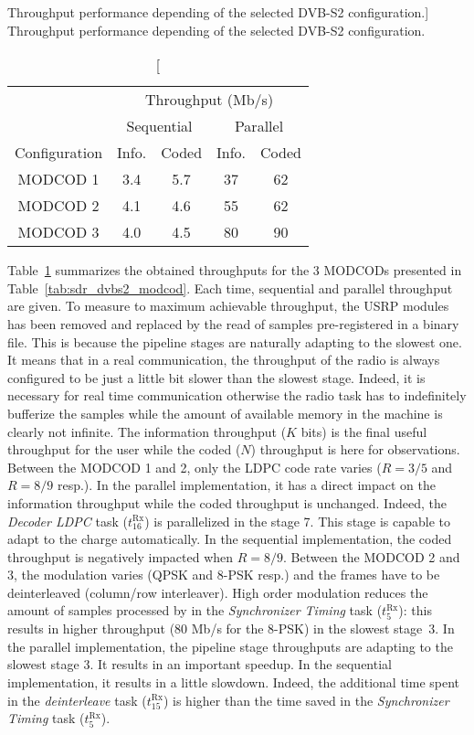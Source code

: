\begin{table}[htp]
  \centering
  \caption
    [Throughput performance depending of the selected DVB-S2 configuration.]
    {Throughput performance depending of the selected DVB-S2 configuration.}
  \label{tab:sdr_dvbs2_thr_modcod}
  \begin{tabular}{c c c c c}
  \toprule
  & \multicolumn{4}{c}{Throughput (Mb/s)} \\
  \cmidrule(lr){2-5}
  & \multicolumn{2}{c}{Sequential} & \multicolumn{2}{c}{Parallel} \\
  \cmidrule(lr){2-3} \cmidrule(lr){4-5}
  Configuration & Info. & Coded & Info. & Coded \\
  \midrule
  MODCOD 1 & 3.4 & 5.7 & 37 & 62 \\
  MODCOD 2 & 4.1 & 4.6 & 55 & 62 \\
  MODCOD 3 & 4.0 & 4.5 & 80 & 90 \\
  \bottomrule
  \end{tabular}
\end{table}

Table~\ref{tab:sdr_dvbs2_thr_modcod} summarizes the obtained throughputs for the
3 MODCODs presented in Table~\ref{tab:sdr_dvbs2_modcod}. Each time, sequential
and parallel throughput are given. To measure to maximum achievable throughput,
the USRP modules has been removed and replaced by the read of samples
pre-registered in a binary file. This is because the pipeline stages are
naturally adapting to the slowest one. It means that in a real communication,
the throughput of the radio is always configured to be just a little bit slower
than the slowest stage. Indeed, it is necessary for real time communication
otherwise the radio task has to indefinitely bufferize the samples while the
amount of available memory in the machine is clearly not infinite. The
information throughput ($K$ bits) is the final useful throughput for the user
while the coded ($N$) throughput is here for observations. Between the MODCOD 1
and 2, only the LDPC code rate varies ($R=3/5$ and $R=8/9$ resp.). In the
parallel implementation, it has a direct impact on the information throughput
while the coded throughput is unchanged. Indeed, the \emph{Decoder LDPC} task
($t^\text{Rx}_{16}$) is parallelized in the stage 7. This stage is capable to
adapt to the charge automatically. In the sequential implementation, the coded
throughput is negatively impacted when $R=8/9$. Between the MODCOD 2 and 3, the
modulation varies (QPSK and 8-PSK resp.) and the frames have to be deinterleaved
(column/row interleaver). High order modulation reduces the amount of samples
processed by in the \emph{Synchronizer Timing} task ($t^\text{Rx}_{5}$): this
results in higher throughput (80 Mb/s for the 8-PSK) in the slowest stage~3. In
the parallel implementation, the pipeline stage throughputs are adapting to the
slowest stage 3. It results in an important speedup. In the sequential
implementation, it results in a little slowdown. Indeed, the additional time
spent in the  \emph{deinterleave} task ($t^\text{Rx}_{15}$) is higher than
the time saved in the \emph{Synchronizer Timing} task ($t^\text{Rx}_{5}$).

